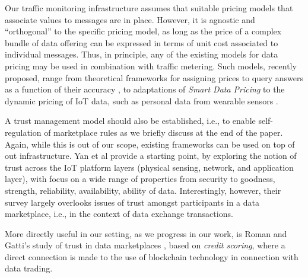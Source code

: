\documentclass[chi_draft]{sigchi}
\begin{document}
Our traffic monitoring infrastructure assumes that suitable pricing models that associate values to messages are in place.
However, it is agnostic and ``orthogonal'' to the specific pricing model, as long as the price of a complex bundle of data offering can be expressed in terms of unit cost associated to individual messages. 
Thus, in principle, any of the existing models for data pricing may be used in combination with traffic metering. Such models, recently proposed, range from theoretical frameworks for assigning prices to query answers as a function of their accuracy \cite{Li:2014:TPP:2691190.2691191}, to adaptations of \textit{Smart Data Pricing} \cite{Sen:2015:SDP:2847579.2756543} to the dynamic pricing of IoT data, such as personal data from wearable sensors \cite{7437020}.

A trust management model should also be established, i.e., to enable self-regulation of marketplace rules as we briefly discuss at the end of the paper.
Again, while this is out of our scope, existing frameworks can be used on top of out infrastructure.
Yan et al \cite{Yan2014a} provide a starting point, by exploring the notion of trust across the IoT platform layers (physical sensing, network, and application layer), with focus on  a wide range of properties from security to goodness, strength, reliability, availability, ability of data. Interestingly, however, their survey largely overlooks issues of trust amongst participants in a data marketplace, i.e., in the context of data exchange transactions.

More directly useful in our setting, as we progress in our work, is Roman and Gatti's study of trust in data marketplaces \cite{7573695}, based on \textit{credit scoring}, where a direct connection is made to the use of blockchain technology in connection with data trading.

\end{document}
